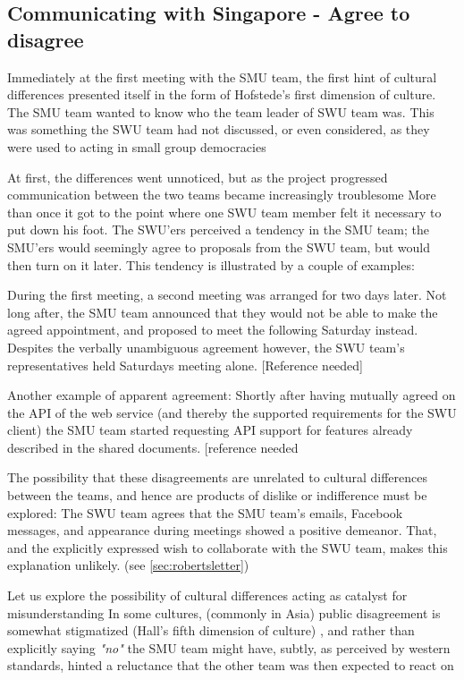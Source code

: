 \subsection{Communicating with Singapore - Agree to disagree}
\label{sec:communicating}

Immediately at the first meeting with the SMU team, the  first hint of cultural
differences presented itself in the form of Hofstede's first
dimension of culture\cite{surprises}. The SMU team wanted to know who the team leader of SWU team was.
This was something the SWU team had not discussed, or even considered, as they
were used to acting in small group democracies

At first, the differences went unnoticed, but as the project progressed
communication between the two teams became increasingly troublesome
More than once it got to the point where one SWU team member felt it necessary
to put down his foot\cite{enough}.
The SWU'ers perceived a tendency in the SMU team; the SMU'ers would seemingly
agree to proposals from the SWU team, but would then turn on it later.
This tendency is illustrated by a couple of examples:

During the first meeting, a second meeting was arranged for two
days later. Not long after, the SMU team announced that they would
not be able to make the agreed appointment, and proposed to meet the following
Saturday instead. Despites the verbally unambiguous agreement however,
the SWU team's representatives held Saturdays meeting alone. [Reference needed]

Another example of apparent agreement:
Shortly after having mutually agreed on the API of the web
service (and thereby the supported requirements for the SWU client)
the SMU team started requesting API support for features already
described in the shared documents. [reference needed

The possibility that these disagreements are unrelated to cultural
differences between the teams, and hence are products of dislike or
indifference must be explored: The SWU team agrees that the SMU team's emails, Facebook
messages, and appearance during meetings showed a positive demeanor. That, and
the explicitly expressed wish to collaborate with the SWU team, makes this
explanation unlikely. (see \ref{sec:robertsletter})

Let us explore the possibility of cultural differences acting as catalyst for
misunderstanding
In some cultures, (commonly in Asia) public
disagreement is somewhat stigmatized (Hall's fifth dimension of
culture\cite{surprises}) \cite{herbsiemens}, and rather
than explicitly saying \emph{"no"} the SMU team might have, subtly,
as perceived by western standards, hinted a reluctance
that the other team was then expected to react on

